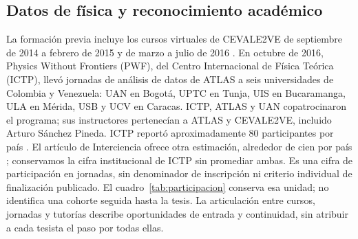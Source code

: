 \subsection{Datos de física y reconocimiento académico}
La formación previa incluye los cursos virtuales de CEVALE2VE de septiembre de 2014 a febrero de 2015 y de marzo a julio de 2016 \cite{cevalejournal}. En octubre de 2016, Physics Without Frontiers (PWF), del Centro Internacional de Física Teórica (ICTP), llevó jornadas de análisis de datos de ATLAS a seis universidades de Colombia y Venezuela: UAN en Bogotá, UPTC en Tunja, UIS en Bucaramanga, ULA en Mérida, USB y UCV en Caracas. ICTP, ATLAS y UAN copatrocinaron el programa; sus instructores pertenecían a ATLAS y CEVALE2VE, incluido Arturo Sánchez Pineda. ICTP reportó aproximadamente 80 participantes por país \cite{pwf2016}. El artículo de Interciencia ofrece otra estimación, alrededor de cien por país \cite{cevalejournal}; conservamos la cifra institucional de ICTP sin promediar ambas. Es una cifra de participación en jornadas, sin denominador de inscripción ni criterio individual de finalización publicado. El cuadro~\ref{tab:participacion} conserva esa unidad; no identifica una cohorte seguida hasta la tesis. La articulación entre cursos, jornadas y tutorías describe oportunidades de entrada y continuidad, sin atribuir a cada tesista el paso por todas ellas.


